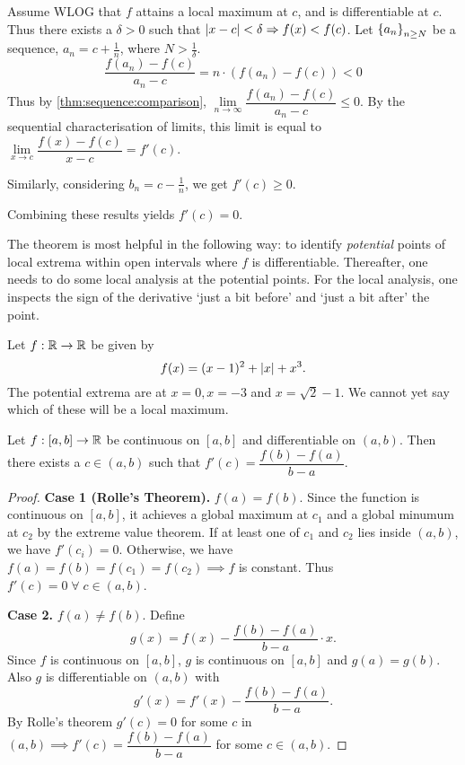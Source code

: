 
Assume WLOG that $f$ attains a local maximum at $c$, and is differentiable at $c$.
Thus there exists a $\delta > 0$ such that $\abs{x - c} < \delta \implies f(x) < f(c)$.
Let $\set{a_{n}}_{n \geq N}$ be a sequence, $a_{n} = c + \frac{1}{n}$, where $N > \frac{1}{\delta}$. \[
    \frac{f(a_{n}) - f(c)}{a_{n} - c} = n \cdot (f(a_{n}) - f(c)) < 0
\] Thus by \cref{thm:sequence:comparison}, $\lim\limits_{n \to \infty} \dfrac{f(a_{n}) - f(c)}{a_{n} - c} \leq 0$.
By the sequential characterisation of limits, this limit is equal to $\lim\limits_{x \to c} \dfrac{f(x) - f(c)}{x - c} = f'(c)$.

Similarly, considering $b_{n} = c - \frac{1}{n}$, we get $f'(c) \geq 0$.

Combining these results yields $f'(c) = 0$.

\begin{rem}
    The theorem is most helpful in the following way: to identify \emph{potential} points of local extrema within open intervals where $f$ is differentiable.
    Thereafter, one needs to do some local analysis at the potential points.
    For the local analysis, one inspects the sign of the derivative `just a bit before' and `just a bit after' the point.
\end{rem}

\begin{example}
    Let $f : \mathbb{R} \to \mathbb{R}$ be given by \[
        f(x) = (x - 1)^{2} + \abs{x} + x^{3}.
    \] The potential extrema are at $x = 0, x = -3$ and $x = \sqrt{2} - 1$.
    We cannot yet say which of these will be a local maximum.
\end{example}

\begin{thm} \label{thm:mvt}
    Let $f : [a, b] \to \mathbb{R}$ be continuous on $[a, b]$ and differentiable on $(a, b)$.
    Then there exists a $c \in (a, b)$ such that $f'(c) = \dfrac{f(b) - f(a)}{b - a}$.
\end{thm}

\begin{proof}
    \textbf{Case 1 (Rolle's Theorem).}
    $f(a) = f(b)$.
    Since the function is continuous on $[a, b]$, it achieves a global maximum at $c_{1}$ and a global minumum at $c_{2}$ by the extreme value theorem.
    If at least one of $c_{1}$ and $c_{2}$ lies inside $(a, b)$, we have $f'(c_{i}) = 0$.
    Otherwise, we have $f(a) = f(b) = f(c_{1}) = f(c_{2}) \implies f$ is constant.
    Thus $f'(c) = 0 \;\forall\; c \in (a, b)$. 

    \textbf{Case 2.}
    $f(a) \neq f(b)$.
    Define \[
        g(x) = f(x) - \frac{f(b) - f(a)}{b - a} \cdot x.
    \] Since $f$ is continuous on $[a, b]$, $g$ is continuous on $[a, b]$ and $g(a) = g(b)$.
    Also $g$ is differentiable on $(a, b)$ with \[
        g'(x) = f'(x) - \frac{f(b) - f(a)}{b - a}.
    \] By Rolle's theorem $g'(c) = 0$ for some $c$ in $(a, b) \implies f'(c) = \dfrac{f(b) - f(a)}{b - a}$ for some $c \in (a, b)$.
\end{proof}





